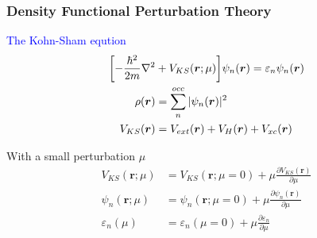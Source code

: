 \begin{frame}[allowframebreaks]
  \frametitle{Density Functional Perturbation Theory}


  \begin{multicols}{2}
    \textcolor{blue}{The Kohn-Sham eqution}
    \begin{align*}
      \biggl[
        -{\hbar^2\over2m}\nabla^2 &+ V_{KS}(\boldsymbol{r}; \mu)
      \biggr]
      \psi_n(\boldsymbol{r})
      =
      \varepsilon_n
      \psi_n(\boldsymbol{r}) \\
      \rho(\boldsymbol{r})
      & =
      \sum_n^{occ} |\psi_n(\boldsymbol{r})|^2 \\
      V_{KS}(\boldsymbol{r})
      & =
      V_{ext}(\boldsymbol{r}) +
      V_{H}(\boldsymbol{r}) +
      V_{xc}(\boldsymbol{r})
    \end{align*}

    With a small perturbation $\mu$
    \begin{align*}
      V_{KS}(\boldsymbol{r}; \mu)
      & =
      V_{KS}(\boldsymbol{r}; \mu=0) +
      \mu \frac{
        \partial V_{KS}(\boldsymbol{r})
      }{
        \partial \mu
      } \\
      \psi_n(\boldsymbol{r}; \mu)
      & =
      \psi_n(\boldsymbol{r}; \mu=0) +
      \mu \frac{
        \partial \psi_n(\boldsymbol{r})
      }{
        \partial \mu
      } \\
      \varepsilon_n(\mu)
      & =
      \varepsilon_n(\mu=0) +
      \mu \frac{
        \partial \varepsilon_n
      }{
        \partial \mu
      }
    \end{align*}
  \end{multicols}
  

\end{frame}
